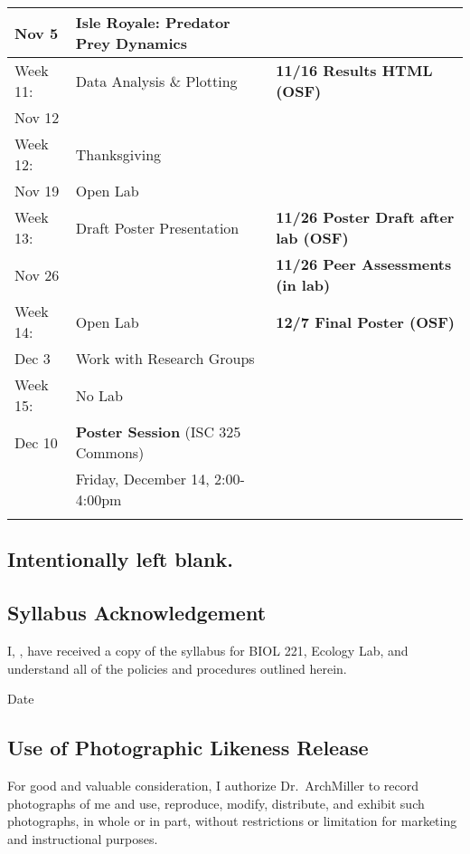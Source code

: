 \documentclass{tufte-handout}
\begin{document}
\begin{tabular}{l l l}
Nov 5 & Isle Royale: Predator Prey Dynamics & \\
\hline
Week 11: & Data Analysis \& Plotting & \textbf{11/16 Results HTML (OSF)} \\
Nov 12 \\
\hline
Week 12: & Thanksgiving \\
Nov 19 & Open Lab \\
\hline
Week 13: & Draft Poster Presentation & \textbf{11/26 Poster Draft after lab (OSF)}\\
Nov 26 &  & \textbf{11/26 Peer Assessments (in lab)}\\
\hline
Week 14: & Open Lab &  \textbf{12/7 Final Poster (OSF)} \\
Dec 3 & Work with Research Groups &\\
\hline 
Week 15: & No Lab & \\
Dec 10 & \textbf{Poster Session} (ISC 325 Commons) &  \\
 & Friday, December 14, 2:00-4:00pm \\
\hline
\\
\end{tabular}


\newpage

\subsection{Intentionally left blank.}

\newpage

\subsection{Syllabus Acknowledgement}

I, \underline{\hspace{5cm}}, have received a copy of the syllabus for BIOL 221, Ecology Lab, and understand all of the policies and procedures outlined herein. 

  \underline{\hspace{5cm}} {Date}  \hrulefill


\subsection{Use of Photographic Likeness Release}

For good and valuable consideration, I authorize Dr.~ArchMiller to record photographs of me and use, reproduce, modify, distribute, and exhibit such photographs, in whole or in part, without restrictions or limitation for marketing and instructional purposes. 
\end{document}
